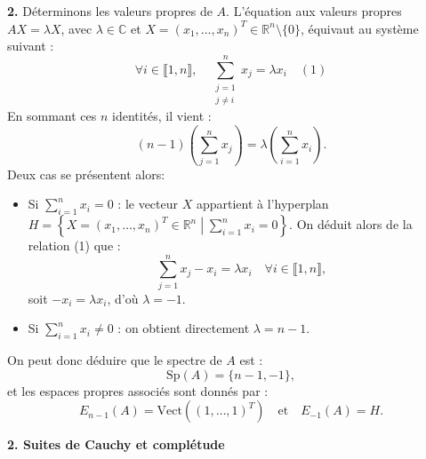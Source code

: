 \documentclass[11pt,a4paper]{report}
\begin{document}
\vspace{0.4cm}

\textbf{2.} Déterminons les valeurs propres de $A$. L'équation aux valeurs propres $AX = \lambda X$, avec $\lambda \in \mathbb{C}$ et $X = (x_1, \dots, x_n)^T \in \mathbb{R}^n \setminus \{0\}$, équivaut au système suivant :
\[
\forall i \in \llbracket 1,n \rrbracket, \quad \sum_{\substack{j=1 \\ j \neq i}}^n x_j = \lambda x_i \quad (1)
\]
En sommant ces $n$ identités, il vient :
\[
(n-1) \left( \sum_{j=1}^n x_j \right) = \lambda \left( \sum_{i=1}^n x_i \right).
\]
Deux cas se présentent alors:
\begin{itemize}
    \item[\textbf{--}] Si $\sum_{i=1}^n x_i = 0$ : le vecteur $X$ appartient à l'hyperplan $H = \left\{ X = (x_1, \dots, x_n)^T \in \mathbb{R}^n \;\left|\; \sum_{i=1}^n x_i = 0 \right.\right\}$. On déduit alors de la relation (1) que :
    \[
    \sum_{j=1}^n x_j - x_i = \lambda x_i \quad \forall i \in \llbracket 1,n \rrbracket,
    \]
    soit $-x_i = \lambda x_i$, d'où $\lambda = -1$.
    \item[\textbf{--}] Si $\sum_{i=1}^n x_i \neq 0$ : on obtient directement $\lambda = n-1$.
\end{itemize}
On peut donc déduire que le spectre de $A$ est :
\[
\boxed{\mathrm{Sp}(A) = \{n-1, -1\},}
\]
et les espaces propres associés sont donnés par :
\[
\boxed{E_{n-1}(A) = \mathrm{Vect}\left((1, \dots, 1)^T\right) \quad \text{et} \quad E_{-1}(A) = H.}
\]

\begin{center}
    \large \textbf{2. Suites de Cauchy et complétude}
\end{center}
\vspace{0.2cm}
\end{document}

